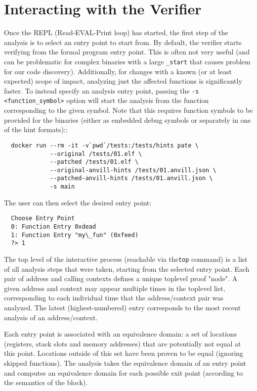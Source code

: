 \section{Interacting with the Verifier}
\label{sec:repl}

Once the REPL (Read-EVAL-Print loop) has started, the first step of the analysis is to select an entry point to start from.
By default, the verifier starts verifying from the formal program entry point.
This is often not very useful (and can be problematic for complex binaries with a large \texttt{\_start} that causes problem for our code discovery).
Additionally, for changes with a known (or at least expected) scope of impact, analyzing just the affected functions is significantly faster.
To instead specify an analysis entry point, passing the \texttt{-s <function\_symbol>} option will start the analysis from the function corresponding to the given symbol.
Note that this requires function symbols to be provided for the binaries (either as embedded debug symbols or separately in one of the hint formats)::
\begin{verbatim}
  docker run --rm -it -v`pwd`/tests:/tests/hints pate \
             --original /tests/01.elf \
             --patched /tests/01.elf \
             --original-anvill-hints /tests/01.anvill.json \
             --patched-anvill-hints /tests/01.anvill.json \
             -s main
\end{verbatim}

The user can then select the desired entry point:
\begin{verbatim}
  Choose Entry Point
  0: Function Entry 0xdead
  1: Function Entry "my\_fun" (0xfeed)
  ?> 1
\end{verbatim}

The top level of the interactive process (reachable via the\texttt{top} command) is a list of all analysis steps that were taken, starting from the selected entry point.
Each pair of address and calling contexts defines a unique toplevel proof "node".
A given address and context may appear multiple times in the toplevel list, corresponding to each individual time that the address/context pair was analyzed.
The latest (highest-numbered) entry corresponds to the most recent analysis of an address/context.

Each entry point is associated with an equivalence domain: a set of locations (registers, stack slots and memory addresses) that are potentially not equal at this point.
Locations outside of this set have been proven to be equal (ignoring skipped functions).
The analysis takes the equivalence domain of an entry point and computes an equivalence domain for each possible exit point (according to the semantics of the block).


